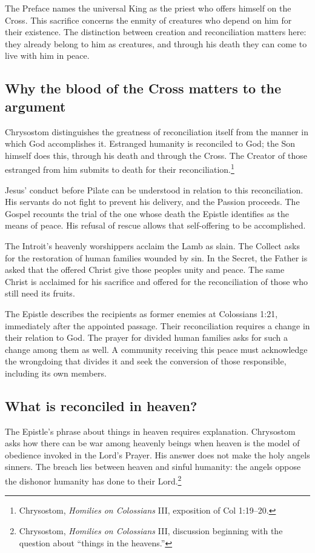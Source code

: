 The Preface names the universal King as the priest who offers himself on the Cross. This sacrifice concerns the enmity of creatures who depend on him for their existence. The distinction between creation and reconciliation matters here: they already belong to him as creatures, and through his death they can come to live with him in peace.

\subsection{Why the blood of the Cross matters to the argument}
Chrysostom distinguishes the greatness of reconciliation itself from the manner in which God accomplishes it. Estranged humanity is reconciled to God; the Son himself does this, through his death and through the Cross. The Creator of those estranged from him submits to death for their reconciliation.\footnote{Chrysostom, \emph{Homilies on Colossians} III, exposition of Col 1:19--20.}

Jesus' conduct before Pilate can be understood in relation to this reconciliation. His servants do not fight to prevent his delivery, and the Passion proceeds. The Gospel recounts the trial of the one whose death the Epistle identifies as the means of peace. His refusal of rescue allows that self-offering to be accomplished.

The Introit's heavenly worshippers acclaim the Lamb as slain. The Collect asks for the restoration of human families wounded by sin. In the Secret, the Father is asked that the offered Christ give those peoples unity and peace. The same Christ is acclaimed for his sacrifice and offered for the reconciliation of those who still need its fruits.

The Epistle describes the recipients as former enemies at Colossians 1:21, immediately after the appointed passage. Their reconciliation requires a change in their relation to God. The prayer for divided human families asks for such a change among them as well. A community receiving this peace must acknowledge the wrongdoing that divides it and seek the conversion of those responsible, including its own members.

\subsection{What is reconciled in heaven?}
The Epistle's phrase about things in heaven requires explanation. Chrysostom asks how there can be war among heavenly beings when heaven is the model of obedience invoked in the Lord's Prayer. His answer does not make the holy angels sinners. The breach lies between heaven and sinful humanity: the angels oppose the dishonor humanity has done to their Lord.\footnote{Chrysostom, \emph{Homilies on Colossians} III, discussion beginning with the question about ``things in the heavens.''}

